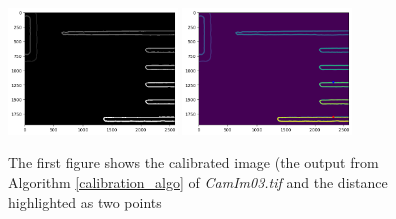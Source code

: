 \documentclass{article}
\begin{document}
\begin{figure}[h!]
\centering
\includegraphics[width=0.4\textwidth]
{Report/Appendix_Images/processed_image_a3.png}
\includegraphics[width=0.4\textwidth]
{Report/Appendix_Images/processed_image_with_points_a3.png}
\caption{The first figure shows the calibrated image (the output from Algorithm \ref{calibration_algo} of \emph{CamIm03.tif} and the distance highlighted as two points} 
\label{A3_Calibration}
\end{figure}
\clearpage
\end{document}

